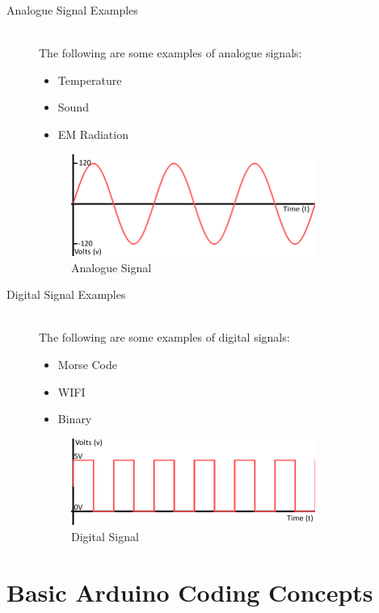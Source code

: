 \begin{description}
	\item[Analogue Signal Examples] \hfill \\
	The following are some examples of analogue signals:
	\begin{itemize}
		\item Temperature
		\item Sound
		\item EM Radiation
	\end{itemize}
	\begin{figure}[ht]
		\centering
		\includegraphics[width=8cm]{images/05}
		\caption{Analogue Signal \citep{lindblom-15}}
		\label{fig:analogue_signal}
	\end{figure}
	
	\item[Digital Signal Examples] \hfill \\
	The following are some examples of digital signals:
	\begin{itemize}
		\item Morse Code
		\item WIFI
		\item Binary
	\end{itemize}
	\begin{figure}[ht]
		\centering
		\includegraphics[width=8cm]{images/06}
		\caption{Digital Signal \citep{lindblom-15}}
		\label{fig:digital_signal}
	\end{figure}
\end{description}






\newpage
\section*{Basic Arduino Coding Concepts}


